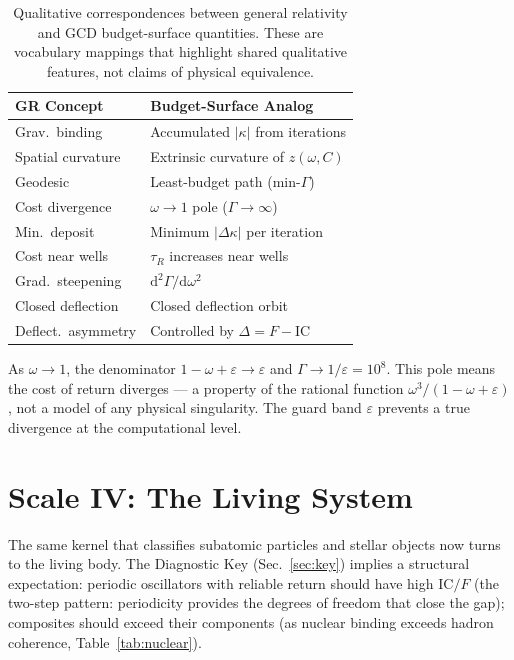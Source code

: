 \documentclass[
  aps,
  prd,
  twocolumn,
  superscriptaddress,
  nofootinbib,
  floatfix
]{revtex4-2}
\newcommand{\tR}{\tau_{\!R}}
\newcommand{\Gam}{\Gamma}
\newcommand{\eps}{\varepsilon}
\newcommand{\dd}{\mathrm{d}}
\newcommand{\IC}{\mathrm{IC}}
\begin{document}
\begin{table}[htbp]
\caption{\label{tab:translation}Qualitative correspondences
between general relativity and GCD budget-surface quantities.
These are vocabulary mappings that highlight shared qualitative
features, not claims of physical equivalence.}
\begin{ruledtabular}
\begin{tabular}{lp{}}
GR Concept & Budget-Surface Analog \\
\hline
Grav.\ binding & Accumulated $|\kappa|$ from iterations \\
Spatial curvature & Extrinsic curvature of $z(\omega, C)$ \\
Geodesic & Least-budget path (min-$\Gam$) \\
Cost divergence & $\omega \to 1$ pole ($\Gam \to \infty$) \\
Min.\ deposit & Minimum $|\Delta\kappa|$ per iteration \\
Cost near wells & $\tR$ increases near wells \\
Grad.\ steepening & $\dd^2\Gam/\dd\omega^2$ \\
Closed deflection & Closed deflection orbit \\
Deflect.\ asymmetry & Controlled by $\Delta = F - \IC$ \\
\end{tabular}
\end{ruledtabular}
\end{table}

As $\omega \to 1$, the denominator $1 - \omega + \eps \to \eps$
and $\Gam \to 1/\eps = 10^8$.  This pole means the cost of
return diverges --- a property of the rational function
$\omega^3/(1 - \omega + \eps)$, not a model of any physical
singularity.  The guard band $\eps$ prevents a true
divergence at the computational level.


\section{Scale IV: The Living System}\label{sec:biology}

The same kernel that classifies subatomic particles and
stellar objects now turns to the living body.  The Diagnostic
Key (Sec.~\ref{sec:key}) implies a structural expectation:
periodic oscillators with reliable return should have high
$\IC/F$ (the two-step pattern: periodicity provides the
degrees of freedom that close the gap); composites should
exceed their components (as nuclear binding exceeds hadron
coherence, Table~\ref{tab:nuclear}).
\end{document}
